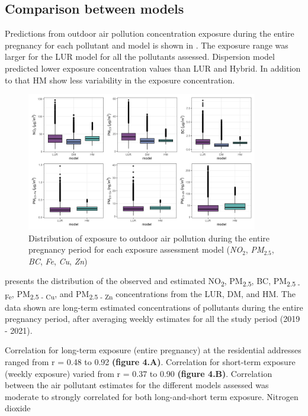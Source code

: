 \documentclass{article}
\begin{document}
\newpage
\subsection{Comparison between models} %
Predictions from outdoor air pollution concentration exposure during the entire pregnancy for each pollutant and model is shown in . The exposure range was larger for the LUR model for all the pollutants assessed. Dispersion model predicted lower exposure concentration values than LUR and Hybrid. In addition to that HM show less variability in the exposure concentration.

\begin{figure}[!htb]
\includegraphics[width=0.9\textwidth]{figures/boxplot_all_models_estimates.png}
\caption{Distribution of exposure to outdoor air pollution during the entire pregnancy period for each exposure assessment model (\textit{NO$_2$}, \textit{PM$_{2.5}$}, \textit{BC}, \textit{Fe}, \textit{Cu}, \textit{Zn})}
\label{fig3}
\end{figure}

\textbf{} presents the distribution of the observed and estimated NO\textsubscript{2}, PM\textsubscript{2.5}, BC,  PM\textsubscript{2.5 - Fe}, PM\textsubscript{2.5 - Cu}, and PM\textsubscript{2.5 - Zn} concentrations from the LUR, DM, and HM. The data shown are long-term estimated concentrations of pollutants during the entire pregnancy period, after averaging weekly estimates for all the study period (2019 - 2021).   
\newpage

Correlation for long-term exposure (entire pregnancy) at the residential addresses ranged from r = 0.48 to 0.92 \textbf{(figure 4.A)}. Correlation for short-term exposure (weekly exposure) varied from r = 0.37 to 0.90 \textbf{(figure 4.B)}. Correlation between the air pollutant estimates for the different models assessed was moderate to strongly correlated for both long-and-short term exposure. Nitrogen dioxide 
\end{document}
